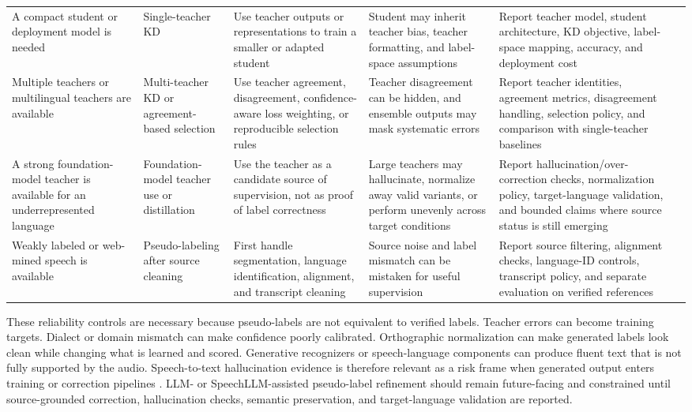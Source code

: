 \documentclass[pdflatex,sn-basic]{sn-jnl}
\theoremstyle{thmstyleone}
\theoremstyle{thmstyletwo}
\theoremstyle{thmstylethree}
\begin{document}
\begin{table}[htbp]
\begin{tabularx}{\textwidth}{YYYYYY}
A compact student or deployment model is needed & Single-teacher KD & Use teacher outputs or representations to train a smaller or adapted student & Student may inherit teacher bias, teacher formatting, and label-space assumptions & Report teacher model, student architecture, KD objective, label-space mapping, accuracy, and deployment cost & \citep{hinton2015distilling,yoon2022interkd} \\
Multiple teachers or multilingual teachers are available & Multi-teacher KD or agreement-based selection & Use teacher agreement, disagreement, confidence-aware loss weighting, or reproducible selection rules & Teacher disagreement can be hidden, and ensemble outputs may mask systematic errors & Report teacher identities, agreement metrics, disagreement handling, selection policy, and comparison with single-teacher baselines & \citep{leal21_interspeech,farooq2023must} \\
A strong foundation-model teacher is available for an underrepresented language & Foundation-model teacher use or distillation & Use the teacher as a candidate source of supervision, not as proof of label correctness & Large teachers may hallucinate, normalize away valid variants, or perform unevenly across target conditions & Report hallucination/over-correction checks, normalization policy, target-language validation, and bounded claims where source status is still emerging & \citep{pmlr-v202-radford23a,ferraz2023multilingualdistilwhisper,gandhi2023distilwhisper} \\
Weakly labeled or web-mined speech is available & Pseudo-labeling after source cleaning & First handle segmentation, language identification, alignment, and transcript cleaning & Source noise and label mismatch can be mistaken for useful supervision & Report source filtering, alignment checks, language-ID controls, transcript policy, and separate evaluation on verified references & \citep{pmlr-v202-radford23a,tian24_interspeech} \\
\bottomrule
\end{tabularx}
\end{table}

These reliability controls are necessary because pseudo-labels are not equivalent to verified labels. Teacher errors can become training targets. Dialect or domain mismatch can make confidence poorly calibrated. Orthographic normalization can make generated labels look clean while changing what is learned and scored. Generative recognizers or speech-language components can produce fluent text that is not fully supported by the audio. Speech-to-text hallucination evidence is therefore relevant as a risk frame when generated output enters training or correction pipelines \citep{koenecke2024carelesswhisper}. LLM- or SpeechLLM-assisted pseudo-label refinement should remain future-facing and constrained until source-grounded correction, hallucination checks, semantic preservation, and target-language validation are reported.
\end{document}

